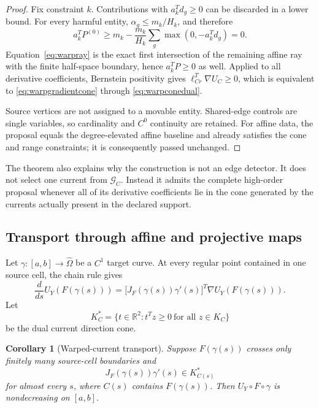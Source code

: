 \documentclass[journal]{IEEEtran}
\newtheorem{corollary}{Corollary}
\newcommand{\R}{\mathbb{R}}
\begin{document}
\begin{proof}
Fix constraint \(k\).  Contributions with \(a_k^Td_g\geq0\) can be
discarded in a lower bound.  For every harmful entity,
\(\alpha_g\leq m_k/H_k\), and therefore
\begin{equation}
 a_k^TP^{(0)}
 \geq m_k-\frac{m_k}{H_k}
       \sum_g\max(0,-a_k^Td_g)
 =0.
 \label{eq:warpcapacityproof}
\end{equation}
Equation~\eqref{eq:warpray} is the exact first intersection of the remaining
affine ray with the finite half-space boundary, hence \(a_k^TP\geq0\) as
well.  Applied to all derivative coefficients, Bernstein positivity gives
\(\ell_{Cr}^T\nabla U_C\geq0\), which is equivalent to
\eqref{eq:warpgradientcone} through \eqref{eq:warpconedual}.

Source vertices are not assigned to a movable entity.  Shared-edge controls
are single variables, so cardinality and \(C^0\) continuity are retained.
For affine data, the proposal equals the degree-elevated affine baseline and
already satisfies the cone and range constraints; it is consequently passed
unchanged.
\end{proof}

The theorem also explains why the construction is not an edge detector.  It
does not select one current from \(\mathcal G_C\).  Instead it admits the
complete high-order proposal whenever all of its derivative coefficients lie
in the cone generated by the currents actually present in the declared
support.

\subsection{Transport through affine and projective maps}

Let \(\gamma:[a,b]\to\widehat\Omega\) be a \(C^1\) target curve.  At every
regular point contained in one source cell, the chain rule gives
\begin{equation}
 \frac{d}{ds}U_Y(F(\gamma(s)))=
 \bigl[J_F(\gamma(s))\gamma'(s)\bigr]^T
 \nabla U_Y(F(\gamma(s))).
 \label{eq:warpchain}
\end{equation}
Let
\begin{equation}
 K_C^*=\{t\in\R^2:t^Tz\geq0\ \text{for all }z\in K_C\}
 \label{eq:warpdual}
\end{equation}
be the dual current direction cone.

\begin{corollary}[Warped-current transport]
Suppose \(F(\gamma(s))\) crosses only finitely many source-cell boundaries
and
\begin{equation}
 J_F(\gamma(s))\gamma'(s)\in K_{C(s)}^*
 \label{eq:warptangentcondition}
\end{equation}
for almost every \(s\), where \(C(s)\) contains \(F(\gamma(s))\).  Then
\(U_Y\circ F\circ\gamma\) is nondecreasing on \([a,b]\).
\end{corollary}
\end{document}
